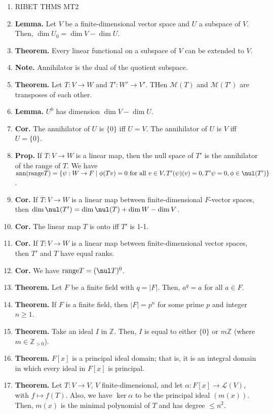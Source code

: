 \begin{enumerate}
	\item RIBET THMS MT2
	\item \textbf{Lemma. } Let $V$ be a finite-dimensional vector space and $U$ a subspace of $V$. Then, $\dim U_0 = \dim V - \dim U$. 
	\item \textbf{Theorem. } Every linear functional on a subspace of $V$ can be extended to $V$. 
	\item \textbf{Note. } Annihilator is the dual of the quotient subspace. 
	\item \textbf{Theorem. } Let $T: V \to W$ and $T': W' \to V'$. THen $\mathscr{M}(T)$ and $\mathscr{M}(T')$ are transposes of each other. 
	\item \textbf{Lemma. } $U^0$ has dimension $\dim V - \dim U$. 
	\item \textbf{Cor. } The annihilator of $U$ is $\{0\}$ iff $U = V$. The annihilator of $U$ is $V$ iff $U = \{0\}$. 
	\item \textbf{Prop. } If $T: V \to W$ is a linear map, then the null space of $T'$ is the annihilator of the range of $T$. We have $\textrm{ann}(\textrm{range}T) = \{\psi: W \to F \mid \phi(Tv)=0 \textrm{ for all } v \in V, T'(\psi)(v)=0, T'\psi = 0, \phi \in \nul(T')\}$. 
	\item \textbf{Cor. } If $T: V \to W$ is a linear map between finite-dimensional $F$-vector spaces, then $\dim \nul(T') = \dim \nul(T) + \dim W - \dim V$. 
	\item \textbf{Cor. } The linear map $T$ is onto iff $T'$ is 1-1. 
	\item \textbf{Cor. } If $T: V \to W$ is a linear map between finite-dimensional vector spaces, then $T'$ and $T$ have equal ranks. 
	\item \textbf{Cor. } We have $\textrm{range}T = (\nul T)^0$. 
	\item \textbf{Theorem. } Let $F$ be a finite field with $q = |F|$. Then, $a^q=a$ for all $a \in F$. 
	\item \textbf{Theorem. } If $F$ is a finite field, then $|F|=p^n$ for some prime $p$ and integer $n \geq 1$. 
	\item \textbf{Theorem. } Take an ideal $I$ in $\mathbb{Z}$. Then, $I$ is equal to either $\{0\}$ or $m\mathbb{Z}$ (where $m \in \mathbb{Z}_{>0}$). 
	\item \textbf{Theorem. } $F[x]$ is a principal ideal domain; that is, it is an integral domain in which every ideal in $F[x]$ is principal. 
	\item \textbf{Theorem. } Let $T: V \to V$, $V$ finite-dimensional, and let $\alpha: F[x] \to \mathscr{L}(V)$, with $f \mapsto f(T)$. Also, we have $\ker\alpha$ to be the principal ideal $(m(x))$. Then, $m(x)$ is the minimal polynomial of $T$ and has degree $\leq n^2$. 

\end{enumerate}
